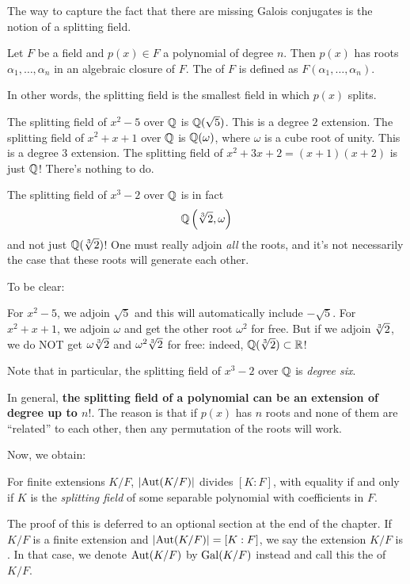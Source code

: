 The way to capture the fact that there are missing Galois conjugates is the notion of a splitting field.
\begin{definition}
	Let $F$ be a field and $p(x) \in F$ a polynomial of degree $n$.
	Then $p(x)$ has roots $\alpha_1, \dots, \alpha_n$ in an algebraic closure of $F$.
	The  of $F$ is defined as $F(\alpha_1, \dots, \alpha_n)$.
\end{definition}
In other words, the splitting field is the smallest field in which $p(x)$ splits.
\begin{example}
	\listhack
	\begin{enumerate}[(a)]
		\ii The splitting field of $x^2 - 5$ over $\mathbb Q$ is $\mathbb Q(\sqrt 5)$.
		This is a degree $2$ extension.
		\ii The splitting field of $x^2+x+1$ over $\mathbb Q$ is $\mathbb Q(\omega)$,
		where $\omega$ is a cube root of unity.
		This is a degree $3$ extension.
		\ii The splitting field of $x^2+3x+2 = (x+1)(x+2)$ is just $\mathbb Q$!
		There's nothing to do.
	\end{enumerate}
\end{example}
\begin{example}
	The splitting field of $x^3 - 2$ over $\mathbb Q$ is in fact
	\[ \mathbb Q\left( \sqrt[3]{2}, \omega \right) \]
	and not just $\mathbb Q(\sqrt[3]{2})$!
	One must really adjoin \emph{all} the roots, and it's not necessarily the case that
	these roots will generate each other.

	To be clear:
	\begin{itemize}
	\ii For $x^2-5$, we adjoin $\sqrt 5$ and this will automatically include $-\sqrt 5$.
	\ii For $x^2+x+1$, we adjoin $\omega$ and get the other root $\omega^2$ for free.
	\ii But if we adjoin $\sqrt[3]{2}$, we do NOT get $\omega\sqrt[3]{2}$ and $\omega^2\sqrt[3]{2}$ for free:
	indeed, $\mathbb Q(\sqrt[3]{2}) \subset \mathbb R$!
	\end{itemize}
	Note that in particular, the splitting field of $x^3-2$ over $\mathbb Q$ is \emph{degree six}.
\end{example}

In general,
\textbf{the splitting field of a polynomial can be an extension of degree up to $n!$}.
The reason is that if $p(x)$ has $n$ roots and none of them are ``related'' to each other,
then any permutation of the roots will work.

Now, we obtain:
\begin{theorem}
	For finite extensions $K/F$, 
	$\left\lvert \operatorname{Aut}(K/F) \right\rvert$ divides $[K:F]$,
	with equality if and only if $K$ is the \emph{splitting field}
	of some separable polynomial with coefficients in $F$.
	\label{thm:Galois_splitting}
\end{theorem}
The proof of this is deferred to an optional section at the end of the chapter.
If $K/F$ is a finite extension and $\left\lvert \operatorname{Aut}(K/F) \right\rvert = [K:F]$,
we say the extension $K/F$ is .
In that case, we denote $\operatorname{Aut}(K/F)$ by $\operatorname{Gal}(K/F)$ instead
and call this the  of $K/F$.

